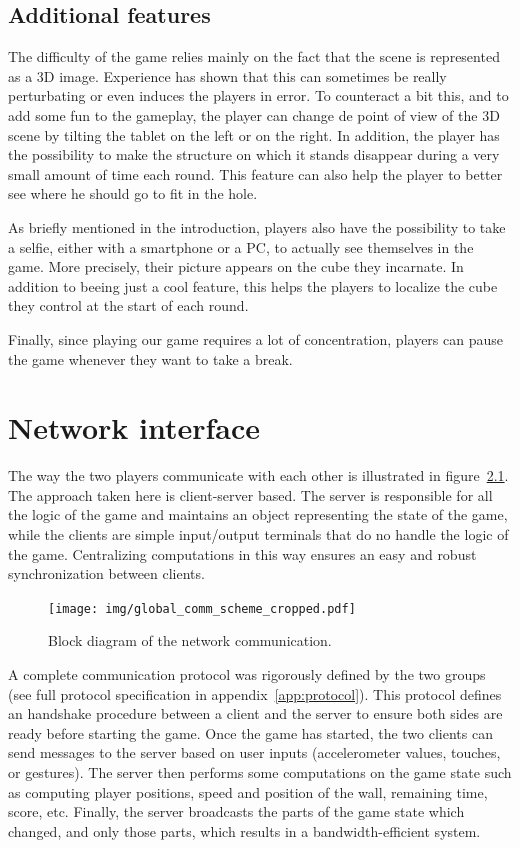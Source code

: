 \documentclass[english, DIV=13]{scrreprt}
\begin{document}
\section{Additional features}
The difficulty of the game relies mainly on the fact that the scene is represented as a
3D image. Experience has shown that this can sometimes be really perturbating or even
induces the players in error. To counteract a bit this, and to add some fun to the
gameplay, the player can change de point of view of the 3D scene by tilting the tablet
on the left or on the right. In addition, the player has the possibility to make the
structure on which it stands disappear during a very small amount of time each round.
This feature can also help the player to better see where he should go to fit in the hole.

As briefly mentioned in the introduction, players also have the possibility to take a
selfie, either with a smartphone or a PC, to actually see themselves in the game. More
precisely, their picture appears on the cube they incarnate. In addition to beeing just a
cool feature, this helps the players to localize the cube they control at the start of
each round.

Finally, since playing our game requires a lot of concentration, players can pause the
game whenever they want to take a break.

\chapter{Network interface}
\label{chap:net-interface}

The way the two players communicate with each other is illustrated in
figure~\ref{fig:comm-scheme}.
The approach taken here is client-server based. The server is responsible
for all the logic of the game and maintains an object representing the state of the game,
while the clients are simple input/output terminals that do no handle the logic of the
game. Centralizing computations in this way ensures an easy and robust synchronization
between clients.

\begin{figure}[hbt]
    \centering
    \texttt{[image: img/global\_comm\_scheme\_cropped.pdf]}
    \caption{Block diagram of the network communication.}
    \label{fig:comm-scheme}
\end{figure}

A complete communication protocol was rigorously defined by the two groups (see full
protocol specification in appendix~\ref{app:protocol}).
This protocol defines an handshake procedure between a client and the server to ensure both
sides are ready before starting the game.
Once the game has started, the two clients can send
messages to the server based on user inputs (accelerometer values, touches, or gestures).
The server then performs some computations on the game state such as computing player
positions, speed and position of the wall, remaining time, score, etc. Finally, the server
broadcasts the parts of the game state which changed, and only those parts, which results
in a bandwidth-efficient system.
\end{document}
